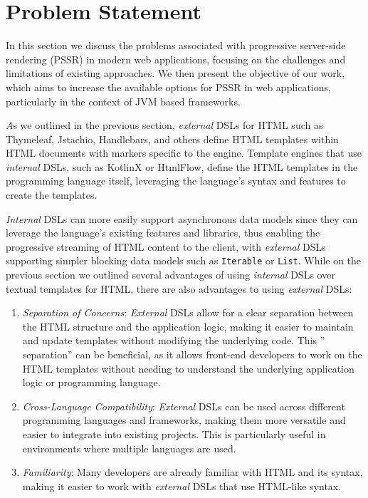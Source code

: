 \section{Problem Statement}

In this section we discuss the problems associated with progressive server-side
rendering (PSSR) in modern web applications, focusing on the challenges and
limitations of existing approaches. We then present the objective of our work,
which aims to increase the available options for PSSR in web applications,
particularly in the context of JVM based frameworks.

\textit As we outlined in the previous section, \textit{external} DSLs for HTML such as Thymeleaf, Jstachio, Handlebars, and others define HTML
templates within HTML documents with markers specific to the engine. Template engines that use \textit{internal} DSLs, such as KotlinX or HtmlFlow,
define the HTML templates in the programming language itself, leveraging the language's
syntax and features to create the templates.

\textit{Internal} DSLs can more easily support asynchronous data models since
they can leverage the language's existing features and libraries, thus enabling
the progressive streaming of HTML content to the client, with \textit{external}
DSLs supporting simpler blocking data models such as \texttt{Iterable} or
\texttt{List}. While on the previous section we outlined several advantages of
using \textit{internal} DSLs over textual templates for HTML, there are also
advantages to using \textit{external} DSLs:

\begin{enumerate}
    \item \emph{Separation of Concerns}: \textit{External} DSLs allow for a clear separation between
          the HTML structure and the application logic, making it easier to maintain and update
          templates without modifying the underlying code. This ''
          separation'' can be beneficial, as it allows front-end developers to work on the HTML
          templates without needing to understand the underlying application logic or programming language.
    \item \emph{Cross-Language Compatibility}: \textit{External} DSLs can be used across different programming languages
          and frameworks, making them more versatile and easier to integrate into existing projects.
          This is particularly useful in environments where multiple languages are used.
    \item \emph{Familiarity}: Many developers are already familiar with HTML and its syntax, making
          it easier to work with \textit{external} DSLs that use HTML-like syntax.
\end{enumerate}

